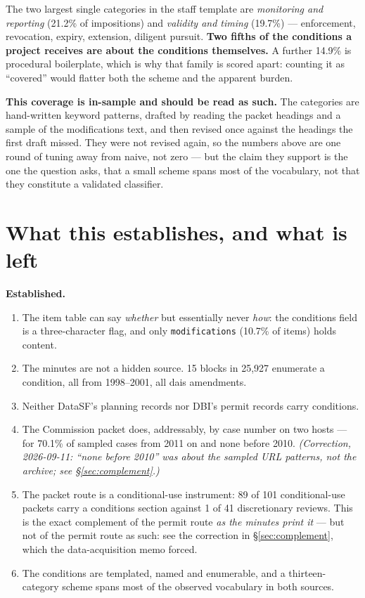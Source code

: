 \documentclass[11pt]{article}
\begin{document}
The two largest single categories in the staff template are \emph{monitoring and reporting}
(21.2\% of impositions) and \emph{validity and timing} (19.7\%) --- enforcement, revocation,
expiry, extension, diligent pursuit. \textbf{Two fifths of the conditions a project receives
are about the conditions themselves.} A further 14.9\% is procedural boilerplate, which is
why that family is scored apart: counting it as ``covered'' would flatter both the scheme and
the apparent burden.

\textbf{This coverage is in-sample and should be read as such.} The categories are hand-written
keyword patterns, drafted by reading the packet headings and a sample of the modifications
text, and then revised once against the headings the first draft missed. They were not revised
again, so the numbers above are one round of tuning away from naive, not zero --- but the claim
they support is the one the question asks, that a small scheme spans most of the vocabulary,
not that they constitute a validated classifier.

\section{What this establishes, and what is left}
\label{sec:left}

\textbf{Established.}
\begin{enumerate}
\item The item table can say \emph{whether} but essentially never \emph{how}: the conditions
field is a three-character flag, and only \texttt{modifications} (10.7\% of items) holds
content.
\item The minutes are not a hidden source. 15 blocks in 25{,}927 enumerate a condition, all
from 1998--2001, all dais amendments.
\item Neither DataSF's planning records nor DBI's permit records carry conditions.
\item The Commission packet does, addressably, by case number on two hosts --- for 70.1\% of
sampled cases from 2011 on and none before 2010. \emph{(Correction, 2026-09-11: ``none before
2010'' was about the sampled URL patterns, not the archive; see \S\ref{sec:complement}.)}
\item The packet route is a conditional-use instrument: 89 of 101 conditional-use packets carry
a conditions section against 1 of 41 discretionary reviews. This is the exact complement of the
permit route \emph{as the minutes print it} --- but not of the permit route as such: see the
correction in \S\ref{sec:complement}, which the data-acquisition memo forced.
\item The conditions are templated, named and enumerable, and a thirteen-category scheme spans
most of the observed vocabulary in both sources.
\end{enumerate}
\end{document}
